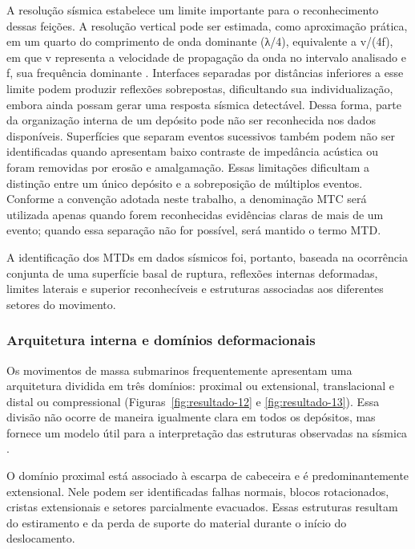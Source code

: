 A resolução sísmica estabelece um limite importante para o reconhecimento dessas feições. A resolução vertical pode ser estimada, como aproximação prática, em um quarto do comprimento de onda dominante (λ/4), equivalente a v/(4f), em que v representa a velocidade de propagação da onda no intervalo analisado e f, sua frequência dominante \cite{yilmaz2001}. Interfaces separadas por distâncias inferiores a esse limite podem produzir reflexões sobrepostas, dificultando sua individualização, embora ainda possam gerar uma resposta sísmica detectável. Dessa forma, parte da organização interna de um depósito pode não ser reconhecida nos dados disponíveis. Superfícies que separam eventos sucessivos também podem não ser identificadas quando apresentam baixo contraste de impedância acústica ou foram removidas por erosão e amalgamação. Essas limitações dificultam a distinção entre um único depósito e a sobreposição de múltiplos eventos. Conforme a convenção adotada neste trabalho, a denominação MTC será utilizada apenas quando forem reconhecidas evidências claras de mais de um evento; quando essa separação não for possível, será mantido o termo MTD.

A identificação dos MTDs em dados sísmicos foi, portanto, baseada na ocorrência conjunta de uma superfície basal de ruptura, reflexões internas deformadas, limites laterais e superior reconhecíveis e estruturas associadas aos diferentes setores do movimento.

\subsubsection{Arquitetura interna e domínios deformacionais}\label{sec:2-3-3-1}

Os movimentos de massa submarinos frequentemente apresentam uma arquitetura dividida em três domínios: proximal ou extensional, translacional e distal ou compressional (Figuras~\ref{fig:resultado-12} e \ref{fig:resultado-13}). Essa divisão não ocorre de maneira igualmente clara em todos os depósitos, mas fornece um modelo útil para a interpretação das estruturas observadas na sísmica \cite{bull2009,scarselli2020}.

O domínio proximal está associado à escarpa de cabeceira e é predominantemente extensional. Nele podem ser identificadas falhas normais, blocos rotacionados, cristas extensionais e setores parcialmente evacuados. Essas estruturas resultam do estiramento e da perda de suporte do material durante o início do deslocamento.

